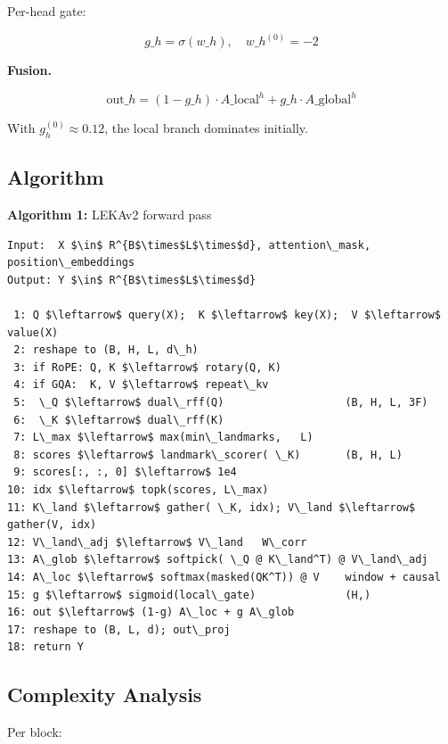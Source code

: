 Per-head gate:

\[
g\_h = \sigma(w\_h), \quad w\_h^{(0)} = -2
\tag{4.13}
\]

\textbf{Fusion.}

\[
\text{out}\_h = (1 - g\_h) \cdot A\_\text{local}^h + g\_h \cdot A\_\text{global}^h
\tag{4.14}
\]

With $g_h^{(0)} \approx 0.12$, the local branch dominates initially.

\subsection{Algorithm}

\textbf{Algorithm 1:} LEKAv2 forward pass
\begin{lstlisting}
Input:  X $\in$ R^{B$\times$L$\times$d}, attention\_mask, position\_embeddings
Output: Y $\in$ R^{B$\times$L$\times$d}

 1: Q $\leftarrow$ query(X);  K $\leftarrow$ key(X);  V $\leftarrow$ value(X)
 2: reshape to (B, H, L, d\_h)
 3: if RoPE: Q, K $\leftarrow$ rotary(Q, K)
 4: if GQA:  K, V $\leftarrow$ repeat\_kv
 5:  \_Q $\leftarrow$ dual\_rff(Q)                   (B, H, L, 3F)
 6:  \_K $\leftarrow$ dual\_rff(K)
 7: L\_max $\leftarrow$ max(min\_landmarks,   L)
 8: scores $\leftarrow$ landmark\_scorer( \_K)       (B, H, L)
 9: scores[:, :, 0] $\leftarrow$ 1e4
10: idx $\leftarrow$ topk(scores, L\_max)
11: K\_land $\leftarrow$ gather( \_K, idx); V\_land $\leftarrow$ gather(V, idx)
12: V\_land\_adj $\leftarrow$ V\_land   W\_corr
13: A\_glob $\leftarrow$ softpick( \_Q @ K\_land^T) @ V\_land\_adj
14: A\_loc $\leftarrow$ softmax(masked(QK^T)) @ V    window + causal
15: g $\leftarrow$ sigmoid(local\_gate)              (H,)
16: out $\leftarrow$ (1-g) A\_loc + g A\_glob
17: reshape to (B, L, d); out\_proj
18: return Y
\end{lstlisting}

\subsection{Complexity Analysis}

Per block:

